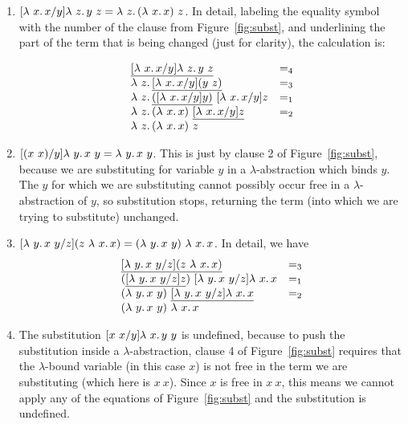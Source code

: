 \begin{enumerate}
\item $[\lambda\ x.\, x/y]\lambda\ z.\, y\ z = \lambda\ z.\, (\lambda\ x.\, x)\ z$.  In detail, labeling the equality symbol with the number of the clause from Figure~\ref{fig:subst}, and underlining the part of the term that is being changed (just for clarity), the calculation is:

  \[
  \begin{array}{ll}
    \underline{[\lambda\ x.\, x/y]\lambda\ z.\, y\ z} & =_4 \\
    \lambda\ z.\, \underline{[\lambda\ x.\, x/y](y\ z)} & =_3 \\
    \lambda\ z.\, \underline{([\lambda\ x.\, x/y]y)}\ [\lambda\ x.\, x/y]z & =_1 \\
    \lambda\ z.\, (\lambda\ x.\, x)\ \underline{[\lambda\ x.\, x/y]z} & =_2 \\
    \lambda\ z.\, (\lambda\ x.\, x)\ z & \
  \end{array}
  \]

\item $[(x\ x)/y]\lam{y}{x\ y} = \lam{y}{x\ y}$.  This is just by clause 2 of Figure~\ref{fig:subst}, because we are substituting for variable $y$ in a $\lambda$-abstraction which binds $y$.  The $y$ for which we are substituting cannot possibly occur free in a $\lambda$-abstraction of $y$, so substitution stops, returning the term (into which we are trying to substitute) unchanged.

\item $[\lambda\ y.\, x\ y/z](z\ \lambda\ x.\, x) = (\lambda\ y.\, x\ y)\ \lambda\ x.\, x$.  In detail, we have
  \[
    \begin{array}{ll}
      \underline{[\lam{y}{x\ y}/z](z\ \lam{x}{x})} & =_3 \\
      (\underline{[\lam{y}{x\ y}/z]z})\ [\lam{y}{x\ y}/z]\lam{x}{x} & =_1 \\
      (\lam{y}{x\ y})\ \underline{[\lam{y}{x\ y}/z]\lam{x}{x}} & =_2 \\
      (\lam{y}{x\ y})\ \lam{x}{x} & \ 
    \end{array}
    \]

  \item The substitution $[x\ x/y]\lam{x}{y\ y}$ is undefined, because
    to push the substitution inside a $\lambda$-abstraction, clause 4
    of Figure~\ref{fig:subst} requires that the $\lambda$-bound
    variable (in this case $x$) is not free in the term we are
    substituting (which here is $x\ x$).  Since $x$ is free in $x\ x$,
    this means we cannot apply any of the equations of Figure~\ref{fig:subst}
    and the substitution is undefined.
\end{enumerate}

